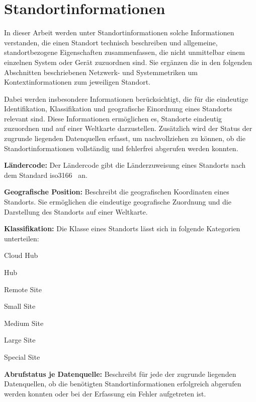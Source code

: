\section{Standortinformationen}
\label{sec:location-metric}

In dieser Arbeit werden unter Standortinformationen solche Informationen
verstanden, die einen Standort technisch beschreiben und allgemeine,
standortbezogene Eigenschaften zusammenfassen, die nicht unmittelbar
einem einzelnen System oder Gerät zuzuordnen sind. Sie ergänzen die in
den folgenden Abschnitten beschriebenen Netzwerk- und Systemmetriken
um Kontextinformationen zum jeweiligen Standort.

Dabei werden insbesondere Informationen berücksichtigt, die für die
eindeutige Identifikation, Klassifikation und geografische Einordnung
eines Standorts relevant sind. Diese Informationen ermöglichen es,
Standorte eindeutig zuzuordnen und auf einer Weltkarte darzustellen.
Zusätzlich wird der Status der zugrunde liegenden Datenquellen erfasst,
um nachvollziehen zu können, ob die Standortinformationen vollständig
und fehlerfrei abgerufen werden konnten.

\begin{compactitem}
    \item \textbf{Ländercode:} Der Ländercode gibt die Länderzuweisung eines
    Standorts nach dem Standard \gls{iso3166}~\cite{iso2026countrycodes} an.

    \item \textbf{Geografische Position:} Beschreibt die geografischen Koordinaten
    eines Standorts. Sie ermöglichen die eindeutige geografische Zuordnung und
    die Darstellung des Standorts auf einer Weltkarte.

    \item \textbf{Klassifikation:} Die Klasse eines Standorts lässt sich in
    folgende Kategorien unterteilen:
    \begin{compactitem}
        \item Cloud Hub
        \item Hub
        \item Remote Site
        \item Small Site
        \item Medium Site
        \item Large Site
        \item Special Site
    \end{compactitem}

    \item \textbf{Abrufstatus je Datenquelle:} Beschreibt für jede der zugrunde
    liegenden Datenquellen, ob die benötigten Standortinformationen erfolgreich
    abgerufen werden konnten oder bei der Erfassung ein Fehler aufgetreten ist.
\end{compactitem}

